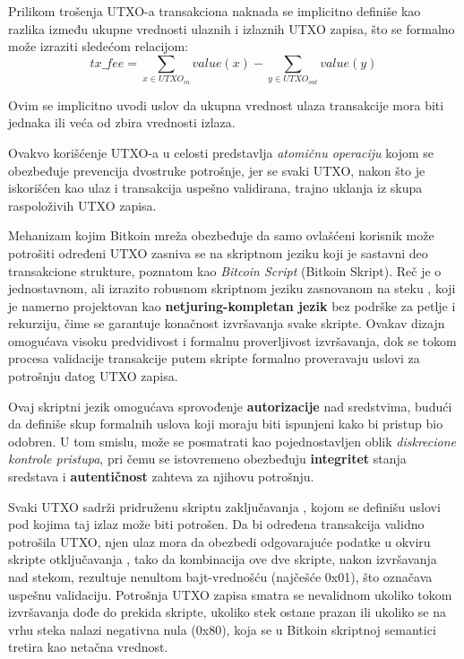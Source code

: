 Prilikom trošenja UTXO-a transakciona naknada se implicitno definiše kao razlika između ukupne vrednosti ulaznih i izlaznih UTXO zapisa, što se formalno može izraziti sledećom relacijom:
$$ tx\_fee = \sum_{x \in UTXO_{in}} value(x) - \sum_{y \in UTXO_{out}} value(y)$$

Ovim se implicitno uvodi uslov da ukupna vrednost ulaza transakcije mora biti jednaka ili veća od zbira vrednosti izlaza. 

Ovakvo korišćenje UTXO-a u celosti predstavlja \textit{atomičnu operaciju} kojom se obezbeđuje prevencija dvostruke potrošnje, jer se svaki UTXO, nakon što je iskorišćen kao ulaz i transakcija uspešno validirana, trajno uklanja iz skupa raspoloživih UTXO zapisa.

Mehanizam kojim Bitkoin mreža obezbeđuje da samo ovlašćeni korisnik može potrošiti određeni UTXO zasniva se na skriptnom jeziku koji je sastavni deo transakcione strukture, poznatom kao \textit{Bitcoin Script} (Bitkoin Skript). Reč je o jednostavnom, ali izrazito robusnom skriptnom jeziku zasnovanom na steku , koji je namerno projektovan kao \textbf{netjuring-kompletan jezik} bez podrške za petlje i rekurziju, čime se garantuje konačnost izvršavanja svake skripte. Ovakav dizajn omogućava visoku predvidivost i formalnu proverljivost izvršavanja, dok se tokom procesa validacije transakcije putem skripte formalno proveravaju uslovi za potrošnju datog UTXO zapisa.

Ovaj skriptni jezik omogućava sprovođenje \textbf{autorizacije} nad sredstvima, budući da definiše skup formalnih uslova koji moraju biti ispunjeni kako bi pristup bio odobren. U tom smislu, može se posmatrati kao pojednostavljen oblik \textit{diskrecione kontrole pristupa}, pri čemu se istovremeno obezbeđuju \textbf{integritet} stanja sredstava i \textbf{autentičnost} zahteva za njihovu potrošnju.

Svaki UTXO sadrži pridruženu skriptu zaključavanja , kojom se definišu uslovi pod kojima taj izlaz može biti potrošen. Da bi određena transakcija validno potrošila UTXO, njen ulaz mora da obezbedi odgovarajuće podatke u okviru skripte otključavanja , tako da kombinacija ove dve skripte, nakon izvršavanja nad stekom, rezultuje nenultom bajt-vrednošću (najčešće 0x01), što označava uspešnu validaciju. Potrošnja UTXO zapisa smatra se nevalidnom ukoliko tokom izvršavanja dođe do prekida skripte, ukoliko stek ostane prazan ili ukoliko se na vrhu steka nalazi negativna nula (0x80), koja se u Bitkoin skriptnoj semantici tretira kao netačna vrednost.

